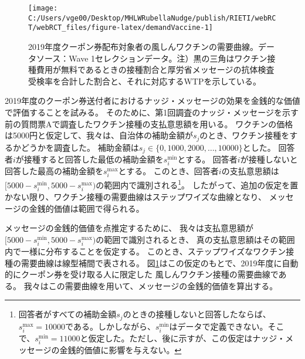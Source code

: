 \documentclass[
  11pt,
  a4paper,
]{article}
\begin{document}
\begin{figure}[t]
\texttt{[image: C:/Users/vge00/Desktop/MHLWRubellaNudge/publish/RIETI/webRCT/webRCT\_files/figure-latex/demandVaccine-1]} \caption{2019年度クーポン券配布対象者の風しんワクチンの需要曲線。データソース：Wave 1セレクションデータ。注）黒の三角はワクチン接種費用が無料であるときの接種割合と厚労省メッセージの抗体検査受検率を合計した割合と、それに対応するWTPを示している。}\label{fig:demandVaccine}
\end{figure}

2019年度のクーポン券送付者におけるナッジ・メッセージの効果を金銭的な価値で評価することを試みる。
そのために、第1回調査のナッジ・メッセージを示す前の質問票Aで調査したワクチン接種の支払意思額を用いる。
ワクチンの価格は5000円と仮定して、我々は、自治体の補助金額が\(s_j\)のとき、ワクチン接種をするかどうかを調査した。
補助金額は\(s_j \in \{0, 1000, 2000, \ldots, 10000\}\)とした。
回答者\(i\)が接種すると回答した最低の補助金額を\(s_i^{\text{min}}\)とする。
回答者\(i\)が接種しないと回答した最高の補助金額を\(s_i^{\text{max}}\)とする。
このとき、回答者\(i\)の支払意思額は
\([5000 - s_i^{\text{min}}, 5000 - s_i^{\text{max}})\)の範囲内で識別される\footnote{回答者がすべての補助金額\(s_j\)のときの接種しないと回答したならば、\(s_i^{\text{max}} = 10000\)である。しかしながら、\(s_i^{\text{min}}\)はデータで定義できない。そこで、\(s_i^{\text{min}} = 11000\)と仮定した。ただし、後に示すが、この仮定はナッジ・メッセージの金銭的価値に影響を与えない。}。
したがって、追加の仮定を置かない限り、ワクチン接種の需要曲線はステップワイズな曲線となり、
メッセージの金銭的価値は範囲で得られる。

メッセージの金銭的価値を点推定するために、
我々は支払意思額が\([5000 - s_i^{\text{min}}, 5000 - s_i^{\text{max}})\)の範囲で識別されるとき、
真の支払意思額はその範囲内で一様に分布することを仮定する。
このとき、ステップワイズなワクチン接種の需要曲線は線型補間で表される。
図\ref{fig:demandVaccine}はこの仮定のもとで、2019年度に自動的にクーポン券を受け取る人に限定した
風しんワクチン接種の需要曲線である。
我々はこの需要曲線を用いて、メッセージの金銭的価値を算出する。
\end{document}
